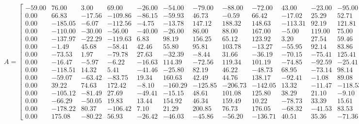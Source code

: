 \documentclass[a4paper, 12pt]{article}
\begin{document}
\[A = 
\left[{
	\begin{array}{rrrrrrrrrrrrrrr}
	-59.00 &   76.00 &    3.00 &   69.00 &  -26.00 &  -54.00 &  -79.00 &  -88.00 &  -72.00 &   43.00 &  -23.00 &  -95.00 &   66.00 &   44.00 &   12.00 \\
	  0.00 &   66.83 &  -17.56 & -109.86 &  -86.15 &  -59.93 &   46.73 &   -0.59 &   66.42 &  -17.02 &   25.29 &   52.71 &  -89.31 &  -88.20 &   94.76 \\
	  0.00 & -185.05 &   -6.07 & -112.56 &   -4.75 &  -13.78 &  147.12 &  188.32 &  148.63 & -113.31 &   92.19 &  121.81 &  -22.49 &   23.34 &   69.73 \\
	  0.00 & -110.00 &  -30.00 &  -56.00 &  -40.00 &  -26.00 &   86.00 &   88.00 &  167.00 &   -5.00 &  119.00 &   75.00 &  -73.00 &   49.00 &   63.00 \\
	  0.00 & -137.97 &  -22.29 & -119.63 &    6.83 &   98.19 &  156.25 &   65.12 &  123.92 &    3.20 &   27.54 &   59.46 & -139.34 &  -37.56 &  -60.15 \\
	  0.00 &   -1.49 &   45.68 &  -58.41 &   42.46 &   55.80 &   95.81 &  103.78 &  -13.27 &  -55.95 &   92.14 &   83.86 &   10.92 &  -57.39 &   72.71 \\
	  0.00 &  -73.53 &    1.97 &  -79.78 &   27.63 &  -32.39 &   -8.44 &   31.66 &  -36.19 &  -70.15 &  -75.41 &  125.41 & -128.75 &  -18.83 &   83.86 \\
	  0.00 &  -16.47 &   -5.97 &   -6.22 &  -16.63 &  114.39 &  -72.56 &  119.34 &  101.19 &  -74.85 &  -92.59 &  -25.41 &  -25.25 &  -42.17 &  -73.86 \\
	  0.00 & -118.51 &   14.32 &    5.41 &  -41.46 &  -25.80 &   82.19 &   46.22 &  -48.73 &   68.95 &  -73.14 &   98.14 &  -79.92 & -108.61 &   -9.71 \\
	  0.00 &  -59.07 &  -63.42 &  -83.75 &   19.34 &  160.63 &   42.49 &   44.76 &  138.17 &  -92.41 &   -1.08 &   89.08 &  -87.32 &  -63.88 &  -21.69 \\
	  0.00 &   39.22 &   74.63 &  172.42 &   -8.10 & -160.29 & -125.85 & -206.73 & -142.05 &   13.32 &  -11.47 & -118.53 &   88.80 &    2.86 &  -40.49 \\
	  0.00 & -105.12 &  -81.49 &   27.69 &  -49.41 &  -15.15 &   48.61 &  101.08 &  125.80 &   38.29 &   21.10 &   -9.10 &  -70.81 &   34.46 &   53.03 \\
	  0.00 &  -66.29 &  -50.05 &   19.83 &   13.44 &  154.92 &   46.34 &  159.49 &   10.22 &  -78.73 &   33.39 &   15.61 &  -41.12 &   27.25 &    6.80 \\
	  0.00 & -178.22 &   80.37 & -106.42 &    7.10 &   21.29 &  200.85 &   76.73 &  176.05 &  -68.32 &  -41.53 &   83.53 &   -1.80 &  -82.86 &   34.49 \\
	  0.00 &  175.08 &  -80.22 &   56.93 &  -26.42 &  -46.03 &  -45.86 &  -56.20 & -136.71 &   40.51 &   35.36 &  -71.36 &  174.15 &   26.10 &  -69.88
	\end{array} 
}\right]\]
\end{document}
